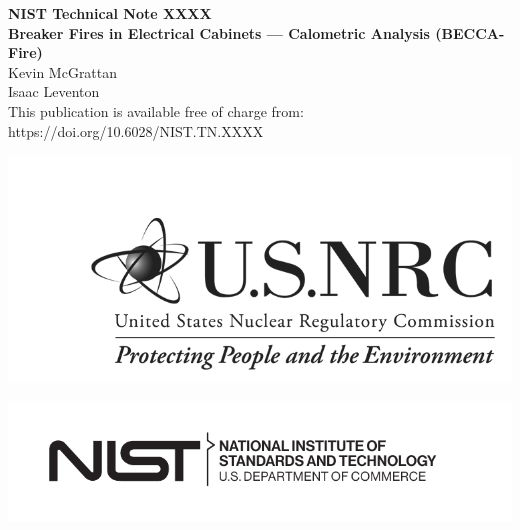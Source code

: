 \documentclass[12pt]{article}
\newcommand{\pubnumber}{XXXX}
\newcommand{\DOI}{https://doi.org/10.6028/NIST.TN.XXXX}
\begin{document}

 \begin{titlepage}
  \begin{flushright}
\LARGE{\textbf{NIST Technical Note \pubnumber}}\\
\vfill
\Huge{\textbf{Breaker Fires in Electrical Cabinets --- Calometric Analysis (BECCA-Fire)}}\\
\vfill
\large Kevin McGrattan \\ Isaac Leventon \\
\vfill
\normalsize This publication is available free of charge from:\\
\DOI\\
\vfill

\includegraphics[width=0.5\linewidth]{../FIGURES/NRC_logo} %

\vspace{0.5in}

\includegraphics[width=0.3\linewidth]{../FIGURES/NIST-logo}\\


\end{flushright}
\end{titlepage}
\end{document}
